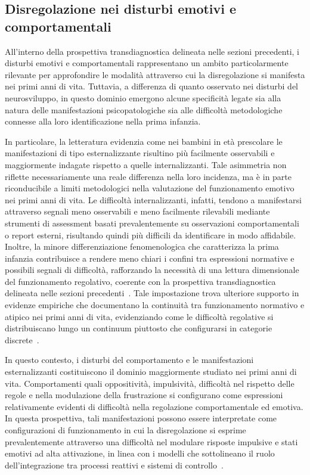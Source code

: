        \subsection{Disregolazione nei disturbi emotivi e comportamentali}
        \label{sec:2_3_3}

            All'interno della prospettiva transdiagnostica delineata nelle sezioni precedenti, i disturbi emotivi e comportamentali rappresentano un ambito particolarmente rilevante per approfondire le modalità attraverso cui la disregolazione si manifesta nei primi anni di vita. Tuttavia, a differenza di quanto osservato nei disturbi del neurosviluppo, in questo dominio emergono alcune specificità legate sia alla natura delle manifestazioni psicopatologiche sia alle difficoltà metodologiche connesse alla loro identificazione nella prima infanzia.

            In particolare, la letteratura evidenzia come nei bambini in età prescolare le manifestazioni di tipo esternalizzante risultino più facilmente osservabili e maggiormente indagate rispetto a quelle internalizzanti. Tale asimmetria non riflette necessariamente una reale differenza nella loro incidenza, ma è in parte riconducibile a limiti metodologici nella valutazione del funzionamento emotivo nei primi anni di vita. Le difficoltà internalizzanti, infatti, tendono a manifestarsi attraverso segnali meno osservabili e meno facilmente rilevabili mediante strumenti di assessment basati prevalentemente su osservazioni comportamentali o report esterni, risultando quindi più difficili da identificare in modo affidabile. Inoltre, la minore differenziazione fenomenologica che caratterizza la prima infanzia contribuisce a rendere meno chiari i confini tra espressioni normative e possibili segnali di difficoltà, rafforzando la necessità di una lettura dimensionale del funzionamento regolativo, coerente con la prospettiva transdiagnostica delineata nelle sezioni precedenti~\cite{cicchetti2009,cole2004,astle2022}. Tale impostazione trova ulteriore supporto in evidenze empiriche che documentano la continuità tra funzionamento normativo e atipico nei primi anni di vita, evidenziando come le difficoltà regolative si distribuiscano lungo un continuum piuttosto che configurarsi in categorie discrete~\cite{egger2006}.

            In questo contesto, i disturbi del comportamento e le manifestazioni esternalizzanti costituiscono il dominio maggiormente studiato nei primi anni di vita. Comportamenti quali oppositività, impulsività, difficoltà nel rispetto delle regole e nella modulazione della frustrazione si configurano come espressioni relativamente evidenti di difficoltà nella regolazione comportamentale ed emotiva. In questa prospettiva, tali manifestazioni possono essere interpretate come configurazioni di funzionamento in cui la disregolazione si esprime prevalentemente attraverso una difficoltà nel modulare risposte impulsive e stati emotivi ad alta attivazione, in linea con i modelli che sottolineano il ruolo dell'integrazione tra processi reattivi e sistemi di controllo~\cite{beauchaine2019}.

